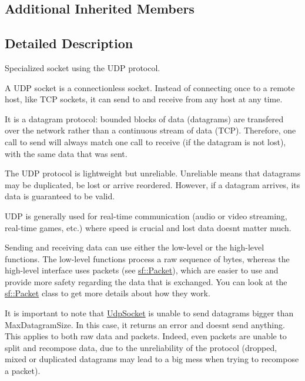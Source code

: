 \subsection*{Additional Inherited Members}


\subsection{Detailed Description}
Specialized socket using the U\+DP protocol. 

\begin{DoxyVerb}\end{DoxyVerb}


A U\+DP socket is a connectionless socket. Instead of connecting once to a remote host, like T\+CP sockets, it can send to and receive from any host at any time.

It is a datagram protocol\+: bounded blocks of data (datagrams) are transfered over the network rather than a continuous stream of data (T\+CP). Therefore, one call to send will always match one call to receive (if the datagram is not lost), with the same data that was sent.

The U\+DP protocol is lightweight but unreliable. Unreliable means that datagrams may be duplicated, be lost or arrive reordered. However, if a datagram arrives, its data is guaranteed to be valid.

U\+DP is generally used for real-\/time communication (audio or video streaming, real-\/time games, etc.) where speed is crucial and lost data doesn\textquotesingle{}t matter much.

Sending and receiving data can use either the low-\/level or the high-\/level functions. The low-\/level functions process a raw sequence of bytes, whereas the high-\/level interface uses packets (see \mbox{\hyperlink{classsf_1_1_packet}{sf\+::\+Packet}}), which are easier to use and provide more safety regarding the data that is exchanged. You can look at the \mbox{\hyperlink{classsf_1_1_packet}{sf\+::\+Packet}} class to get more details about how they work.

It is important to note that \mbox{\hyperlink{classsf_1_1_udp_socket}{Udp\+Socket}} is unable to send datagrams bigger than Max\+Datagram\+Size. In this case, it returns an error and doesn\textquotesingle{}t send anything. This applies to both raw data and packets. Indeed, even packets are unable to split and recompose data, due to the unreliability of the protocol (dropped, mixed or duplicated datagrams may lead to a big mess when trying to recompose a packet).

